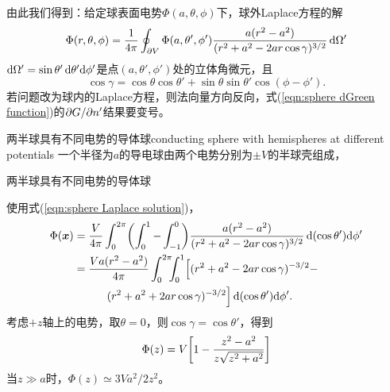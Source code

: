 由此我们得到：给定球表面电势$\Phi(a,\theta,\phi)$下，球外Laplace方程的解
\begin{equation}
    \label{eqn:sphere Laplace solution}
    \Phi(r,\theta,\phi)=\frac1{4\pi}\oint_{\p V}\Phi(a,\theta',\phi')\frac{a(r^2-a^2)}{(r^2+a^2-2ar\cos\gamma)^{3/2}}\d\Omega'
\end{equation}
$\d\Omega'=\sin\theta'\d\theta'\nd\phi'$是点$(a,\theta',\phi')$处的立体角微元，且
\[
    \cos\gamma=\cos\theta\cos\theta'+\sin\theta\sin\theta'\cos(\phi-\phi').
\]
若问题改为球内的Laplace方程，则法向量方向反向，式(\ref{eqn:sphere dGreen function})的$\p G/\p n'$结果要变号。
\begin{example}{两半球具有不同电势的导体球}{conducting sphere with hemispheres at different potentials}
    一个半径为$a$的导电球由两个电势分别为$\pm V$的半球壳组成，
    \begin{center}
        \tikzchap 两半球具有不同电势的导体球
    \end{center}
    使用式(\ref{eqn:sphere Laplace solution})，
    \begin{align*}
        \Phi(\bm x)&=\frac V{4\pi}\int_0^{2\pi}\biggkh{\int_0^1-\int_{-1}^0}\frac{a(r^2-a^2)}{(r^2+a^2-2ar\cos\gamma)^{3/2}}\d(\cos\theta')\nd\phi'\\
        &=\frac{Va(r^2-a^2)}{4\pi}\int_0^{2\pi}\bs5\int_0^1\Bigl[(r^2+a^2-2ar\cos\gamma)^{-3/2}-\\
        &\qqquad(r^2+a^2+2ar\cos\gamma)^{-3/2}\Bigr]\d(\cos\theta')\nd\phi'.
    \end{align*}
    考虑$+z$轴上的电势，取$\theta=0$，则$\cos\gamma=\cos\theta'$，得到 
    \begin{equation}
        \Phi(z)=V\biggfkh{1-\frac{z^2-a^2}{z\sqrt{z^2+a^2}}}
    \end{equation}
    当$z\gg a$时，$\Phi(z)\simeq 3Va^2/2z^2$。


\end{example}
